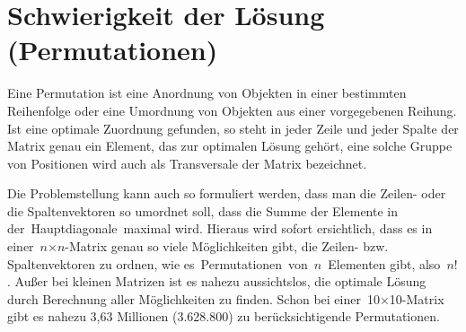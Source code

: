 %
%
%
\section{Schwierigkeit der Lösung (Permutationen)
\label{munkres:section:teil2}}

Eine Permutation ist eine Anordnung von Objekten in einer bestimmten Reihenfolge oder eine Umordnung von Objekten aus einer vorgegebenen Reihung. Ist eine optimale Zuordnung gefunden, so steht in jeder Zeile und jeder Spalte der Matrix genau ein Element, das zur optimalen Lösung gehört, eine solche Gruppe von Positionen wird auch als Transversale der Matrix bezeichnet. 

Die Problemstellung kann auch so formuliert werden, dass man die Zeilen- oder die Spaltenvektoren so umordnet soll, dass die Summe der Elemente in der Hauptdiagonale maximal wird. Hieraus wird sofort ersichtlich, dass es in einer $n$×$n$-Matrix genau so viele Möglichkeiten gibt, die Zeilen- bzw. Spaltenvektoren zu ordnen, wie es Permutationen von $n$ Elementen gibt, also $n!$. Außer bei kleinen Matrizen ist es nahezu aussichtslos, die optimale Lösung durch Berechnung aller Möglichkeiten zu finden. Schon bei einer 10×10-Matrix gibt es nahezu 3,63 Millionen (3.628.800) zu berücksichtigende Permutationen.

